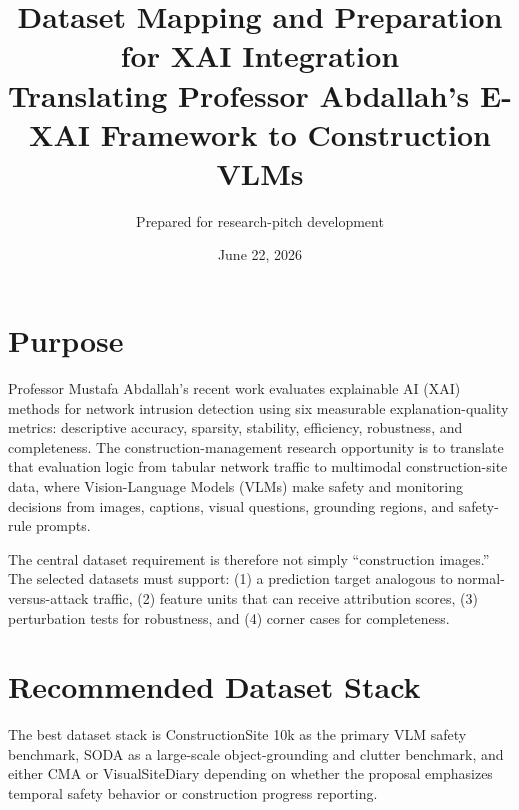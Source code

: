 \documentclass[10pt]{article}
\title{\vspace{-1.5em}Dataset Mapping and Preparation for XAI Integration\\
\large Translating Professor Abdallah's E-XAI Framework to Construction VLMs}
\author{Prepared for research-pitch development}
\date{June 22, 2026}
\begin{document}
\maketitle
\vspace{-1.2em}

\section{Purpose}
Professor Mustafa Abdallah's recent work evaluates explainable AI (XAI) methods for network intrusion detection using six measurable explanation-quality metrics: descriptive accuracy, sparsity, stability, efficiency, robustness, and completeness. The construction-management research opportunity is to translate that evaluation logic from tabular network traffic to multimodal construction-site data, where Vision-Language Models (VLMs) make safety and monitoring decisions from images, captions, visual questions, grounding regions, and safety-rule prompts.

The central dataset requirement is therefore not simply ``construction images.'' The selected datasets must support: (1) a prediction target analogous to normal-versus-attack traffic, (2) feature units that can receive attribution scores, (3) perturbation tests for robustness, and (4) corner cases for completeness.

\section{Recommended Dataset Stack}
The best dataset stack is ConstructionSite 10k as the primary VLM safety benchmark, SODA as a large-scale object-grounding and clutter benchmark, and either CMA or VisualSiteDiary depending on whether the proposal emphasizes temporal safety behavior or construction progress reporting.
\end{document}
